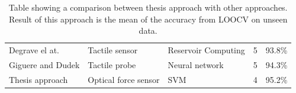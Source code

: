 \documentclass[USenglish]{ifimaster}  %
\begin{document}
\begin{table}[h]
{\begin{tabular}{@{}lllll@{}}
				\multirow{2}{*}{Degrave el at. \cite{6784609}} & \multirow{2}{*}{Tactile sensor} & \multirow{2}{*}{Reservoir Computing} & \multirow{2}{*}{5} & \multirow{2}{*}{93.8\%} \\
				&  &  &  &  \\
				\multirow{2}{*}{Giguere and Dudek \cite{5752869}} & \multirow{2}{*}{Tactile probe} & \multirow{2}{*}{Neural network} & \multirow{2}{*}{5} & \multirow{2}{*}{94.3\%} \\
				&  &  &  &  \\
				\multirow{2}{*}{Thesis approach} & \multirow{2}{*}{Optical force sensor} & \multirow{2}{*}{SVM} & \multirow{2}{*}{4} & \multirow{2}{*}{95.2\%} \\
				&  &  &  &  \\ \bottomrule
			\end{tabular}%
		}
		\caption{Table showing a comparison between thesis approach with other approaches. Result of this approach is the mean of the accuracy from LOOCV on unseen data.}
		\label{table:compareEarly}
	\end{table}
	\FloatBarrier
	

	
\end{document}
